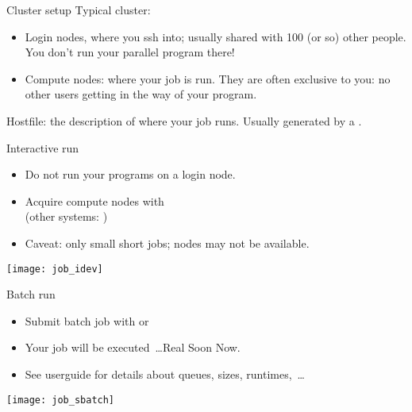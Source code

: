 
\begin{numberedframe}{Cluster setup}
  \small
  Typical cluster:
  \begin{itemize}
  \item Login nodes, where you ssh into; usually shared with 100 (or
    so) other people. You don't run your parallel program there!
  \item Compute nodes: where your job is run. They are often exclusive
    to you: no other users getting in the way of your program.
  \end{itemize}
  Hostfile: the description of where your job runs. Usually generated
  by a .
\end{numberedframe}

\begin{numberedframe}{Interactive run}
  \begin{itemize}
  \item Do not run your programs on a login node.
  \item Acquire compute nodes with  \\
    (other systems: )
  \item Caveat: only small short jobs; nodes may not be available.
  \end{itemize}
  \texttt{[image: job\_idev]}
\end{numberedframe}

\begin{numberedframe}{Batch run}
  \begin{itemize}
  \item Submit batch job with  or 
  \item Your job will be executed~\ldots Real Soon Now.
  \item See userguide for details about queues, sizes, runtimes,~\ldots
  \end{itemize}
  \texttt{[image: job\_sbatch]}
\end{numberedframe}


